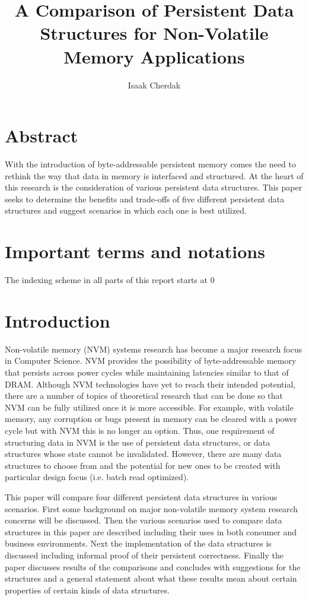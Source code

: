 \documentclass[twocolumn]{article}
\title{A Comparison of Persistent Data Structures for Non-Volatile Memory
Applications}
\author{Isaak Cherdak}
\begin{document}
\maketitle

\section*{Abstract}

With the introduction of byte-addressable persistent memory comes the need to
rethink the way that data in memory is interfaced and structured. At the heart
of this research is the consideration of various persistent data structures.
This paper seeks to determine the benefits and trade-offs of five different
persistent data structures and suggest scenarios in which each one is best
utilized.

\pagebreak

\section*{Important terms and notations}


The indexing scheme in all parts of this report starts at 0


\section{Introduction}

Non-volatile memory (NVM) systems research has become a major research focus in
Computer Science. NVM provides the possibility of byte-addressable memory that
persists across power cycles while maintaining latencies similar to that of
DRAM. Although NVM technologies have yet to reach their intended potential,
there are a number of topics of theoretical research that can be done so that
NVM can be fully utilized once it is more accessible. For example, with volatile
memory, any corruption or bugs present in memory can be cleared with a power
cycle but with NVM this is no longer an option. Thus, one requirement of
structuring data in NVM is the use of persistent data structures, or data
structures whose state cannot be invalidated. However, there are many data
structures to choose from and the potential for new ones to be created with
particular design focus (i.e. batch read optimized).

This paper will compare four different persistent data structures in various
scenarios. First some background on major non-volatile memory system research
concerns will be discussed. Then the various scenarios used to compare data
structures in this paper are described including their uses in both consumer and
business environments. Next the implementation of the data structures is
discussed including informal proof of their persistent correctness. Finally the
paper discusses results of the comparisons and concludes with suggestions for
the structures and a general statement about what these results mean about
certain properties of certain kinds of data structures.
\end{document}
